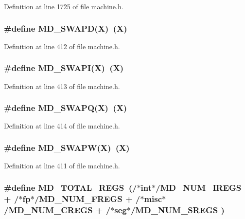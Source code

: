 Definition at line 1725 of file machine.h.
\subsubsection[{MD\_\-SWAPD}]{\setlength{\rightskip}{0pt plus 5cm}\#define MD\_\-SWAPD(X)~(X)}\label{machine_8h_8945185b4ed86ba9344f06695903b74a}




Definition at line 412 of file machine.h.
\subsubsection[{MD\_\-SWAPI}]{\setlength{\rightskip}{0pt plus 5cm}\#define MD\_\-SWAPI(X)~(X)}\label{machine_8h_2ee4dc0002ba2a5b8af5a3b1df3a12a3}




Definition at line 413 of file machine.h.
\subsubsection[{MD\_\-SWAPQ}]{\setlength{\rightskip}{0pt plus 5cm}\#define MD\_\-SWAPQ(X)~(X)}\label{machine_8h_8671622114637e8d4bc975a00b9b5d7b}




Definition at line 414 of file machine.h.
\subsubsection[{MD\_\-SWAPW}]{\setlength{\rightskip}{0pt plus 5cm}\#define MD\_\-SWAPW(X)~(X)}\label{machine_8h_9e3a655a1aa8f906bf62279d13075bea}




Definition at line 411 of file machine.h.
\subsubsection[{MD\_\-TOTAL\_\-REGS}]{\setlength{\rightskip}{0pt plus 5cm}\#define MD\_\-TOTAL\_\-REGS~(/$\ast$int$\ast$/MD\_\-NUM\_\-IREGS + /$\ast$fp$\ast$/MD\_\-NUM\_\-FREGS + /$\ast$misc$\ast$/MD\_\-NUM\_\-CREGS + /$\ast$seg$\ast$/MD\_\-NUM\_\-SREGS )}\label{machine_8h_fe3f361f13b4d59d0f770023d0e26e29}




